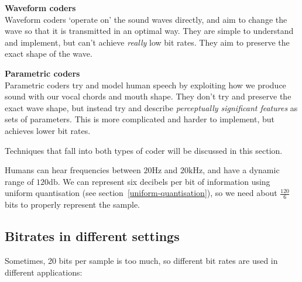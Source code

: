 \begin{description}
  \item \textbf{Waveform coders}\\
  Waveform coders `operate on' the sound waves directly, and aim to change the
  wave so that it is transmitted in an optimal way. They are simple to
  understand and implement, but can't achieve \textit{really} low bit rates.
  They aim to preserve the exact shape of the wave.

  \item \textbf{Parametric coders}\\
  Parametric coders try and model human speech by exploiting how we produce
  sound with our vocal chords and mouth shape. They don't try and preserve the
  exact wave shape, but instead try and describe \textit{perceptually
  significant features} as sets of parameters. This is more complicated and
  harder to implement, but achieves lower bit rates.
\end{description}

Techniques that fall into both types of coder will be discussed in this section.


Humans can hear frequencies between $20\si{\hertz}$ and $20\si{\kilo\hertz}$,
and have a dynamic range of $120\si{\decibel}$. We can represent six decibels
per bit of information using uniform quantisation (see section~\ref{uniform-quantisation}),
so we need about $\frac{120}{6}$ bits to properly represent the sample.

\subsection{Bitrates in different settings}

Sometimes, 20 bits per sample is too much, so different bit rates are used in
different applications:

